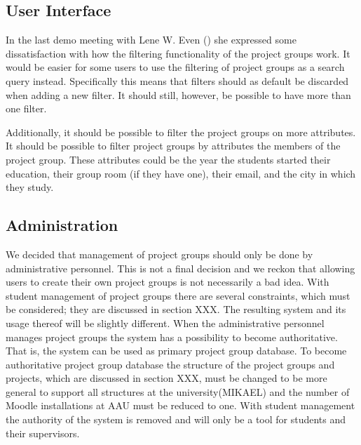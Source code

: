 \subsection{User Interface}
In the last demo meeting with Lene W. Even () she expressed some dissatisfaction with how the filtering functionality of the project groups work.
It would be easier for some users to use the filtering of project groups as a search query instead.
Specifically this means that filters should as default be discarded when adding a new filter.
It should still, however, be possible to have more than one filter.

Additionally, it should be possible to filter the project groups on more attributes.
It should be possible to filter project groups by attributes the members of the project group.
These attributes could be the year the students started their education, their group room (if they have one), their email, and the city in which they study.


\subsection{Administration}
We decided that management of project groups should only be done by administrative personnel. 
This is not a final decision and we reckon that allowing users to create their own project groups is not necessarily a bad idea. 
With student management of project groups there are several constraints, which must be considered; they are discussed in section XXX. 
The resulting system and its usage thereof will be slightly different.
When the administrative personnel manages project groups the system has a possibility to become authoritative.
That is, the system can be used as primary project group database. 
To become authoritative project group database the structure of the project groups and projects, which are discussed in section XXX, must be changed to be more general to support all structures at the university(MIKAEL) and the number of Moodle installations at AAU must be reduced to one. 
With student management the authority of the system is removed and will only be a tool for students and their supervisors.



